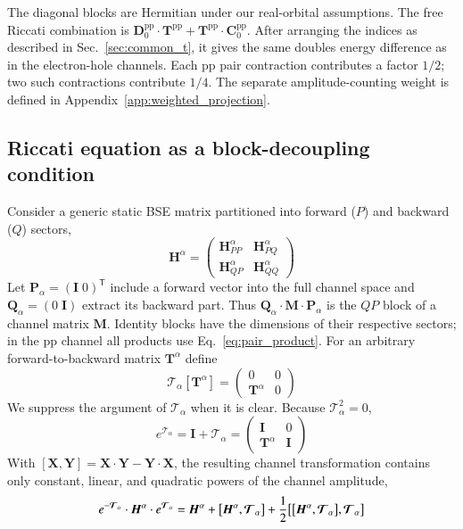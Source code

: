 \documentclass[aip,jcp,reprint,noshowkeys,superscriptaddress]{revtex4-1}
\newcommand{\pp}{\text{pp}}
\newcommand{\bT}{\boldsymbol{T}}
\newcommand{\bC}{\boldsymbol{C}}
\newcommand{\bD}{\boldsymbol{D}}
\newcommand{\bH}{\boldsymbol{H}}
\newcommand{\bI}{\boldsymbol{I}}
\newcommand{\bM}{\boldsymbol{M}}
\newcommand{\bP}{\boldsymbol{P}}
\newcommand{\bQ}{\boldsymbol{Q}}
\newcommand{\bX}{\boldsymbol{X}}
\newcommand{\bY}{\boldsymbol{Y}}
\newcommand{\bcalT}{\boldsymbol{\mathcal{T}}}
\begin{document}
The diagonal blocks are Hermitian under our real-orbital assumptions.
The free Riccati combination is
$\bD_0^{\pp}\cdot\bT^{\pp}+\bT^{\pp}\cdot \bC_0^{\pp}$.
After arranging the indices as described in Sec.~\ref{sec:common_t}, it gives
the same doubles energy difference as in the electron-hole channels. Each
$\pp$ pair contraction contributes a factor $1/2$; two such contractions
contribute $1/4$. The separate amplitude-counting weight is defined in
Appendix~\ref{app:weighted_projection}.

\subsection{Riccati equation as a block-decoupling condition}
\label{sec:generic_decoupling}

Consider a generic static BSE matrix partitioned into forward ($P$) and
backward ($Q$) sectors,
\begin{equation*}
    \bH^{\alpha}=
    \begin{pmatrix}
        \bH_{PP}^{\alpha}&\bH_{PQ}^{\alpha}\\
        \bH_{QP}^{\alpha}&\bH_{QQ}^{\alpha}
    \end{pmatrix}
\end{equation*}
Let $\bP_{\alpha}=(\bI\;0)^{\mathsf T}$ include a forward vector into the
full channel space and $\bQ_{\alpha}=(0\;\bI)$ extract its backward part.
Thus $\bQ_{\alpha}\cdot\bM\cdot\bP_{\alpha}$ is the $QP$ block of a channel matrix
$\bM$. Identity blocks have the dimensions of their respective sectors;
in the $\pp$ channel all products use Eq.~\eqref{eq:pair_product}.
For an arbitrary forward-to-backward matrix $\bT^{\alpha}$ define
\begin{equation}
    \bcalT_{\alpha}[\bT^{\alpha}]=
    \begin{pmatrix}
        0&0\\
        \bT^{\alpha}&0
    \end{pmatrix}
    \label{eq:nilpotent_generator}
\end{equation}
We suppress the argument of $\bcalT_{\alpha}$ when it is clear. Because $\bcalT_{\alpha}^2=0$,
\begin{equation}
    e^{\bcalT_{\alpha}}
    =\bI+\bcalT_{\alpha}
    =
    \begin{pmatrix}
        \bI&0\\
        \bT^{\alpha}&\bI
    \end{pmatrix}
    \label{eq:S_exp}
\end{equation}
With $[\bX,\bY]=\bX\cdot\bY-\bY\cdot\bX$, the resulting channel transformation contains only
constant, linear, and quadratic powers of the channel amplitude,
\begin{equation}
    e^{-\bcalT_{\alpha}}\cdot \bH^{\alpha}\cdot e^{\bcalT_{\alpha}}
    =
    \bH^{\alpha}+\comm{\bH^{\alpha}}{\bcalT_{\alpha}}
    +\frac12\comm{\comm{\bH^{\alpha}}{\bcalT_{\alpha}}}{\bcalT_{\alpha}}
    \label{eq:channel_BCH}
\end{equation}
\end{document}
